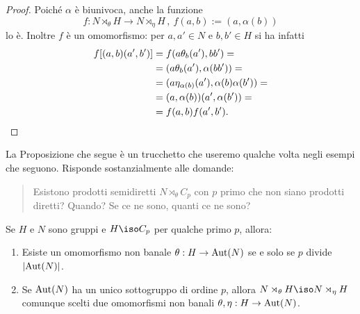 \begin{proof}
Poiché $\alpha$ è biunivoca, anche la funzione
\[f : N \rtimes_\theta H \to N \rtimes_\eta H \,,\ f(a,b) := (a,\alpha(b))\]
lo è. Inoltre $f$ è un omomorfismo: per $a,a'\in N$ e $b,b'\in H$ si ha infatti
\begin{align*}
f[(a,b)(a',b')] &= f(a\theta_b(a'),bb') = \\ 
                &= (a\theta_b(a'),\alpha(bb')) = \\
                &= (a\eta_{\alpha(b)}(a'),\alpha(b)\alpha(b')) = \\
                &= (a,\alpha(b))(a',\alpha(b')) = \\
                &= f(a,b)f(a',b'). \qedhere
\end{align*}
\end{proof}

La Proposizione che segue è un trucchetto che useremo qualche volta negli esempi che seguono. Risponde sostanzialmente alle domande:

\begin{quotation}
Esistono prodotti semidiretti $N \rtimes_\theta C_p$ con $p$ primo che non siano prodotti diretti? Quando? Se ce ne sono, quanti ce ne sono?
\end{quotation}

\begin{prop}
Se $H$ e $N$ sono gruppi e $H \iso C_p$ per qualche primo $p$, allora:
\begin{enumerate}
\item Esiste un omomorfismo non banale $\theta : H \to \mathrm{Aut}(N)$ se e solo se $p$ divide $\left\lvert\mathrm{Aut}(N)\right\rvert$.
\item Se $\mathrm{Aut}(N)$ ha un unico sottogruppo di ordine $p$, allora $N \rtimes_\theta H \iso N \rtimes_\eta H$ comunque scelti due omomorfismi non banali $\theta, \eta : H \to \mathrm{Aut}(N)$.
\end{enumerate}
\end{prop}

